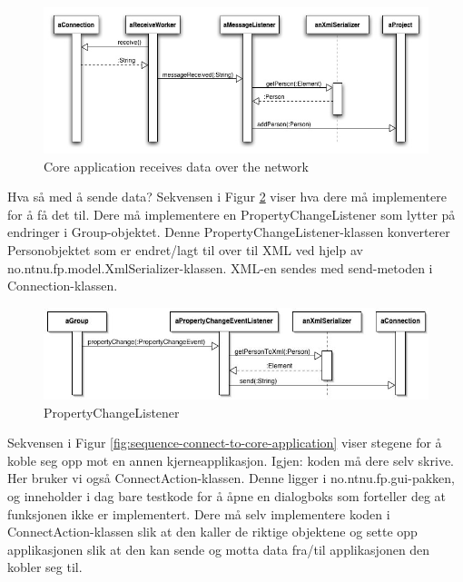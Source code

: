 \begin{figure}[H]
    \centering
    \includegraphics[width=\textwidth]{resources/sequence-core-application-receive-data.jpg}
    \caption{Core application receives data over the network}
    \label{fig:sequence-core-application-receive-data}
\end{figure}

Hva så med å sende data? Sekvensen i Figur \ref{fig:sequence-property-change-listener} viser hva dere må implementere for å få det til. Dere må implementere en PropertyChangeListener som lytter på endringer i Group-objektet. Denne PropertyChangeListener-klassen konverterer Personobjektet som er endret/lagt til over til XML ved hjelp av no.ntnu.fp.model.XmlSerializer-klassen. XML-en sendes med send-metoden i Connection-klassen.

\begin{figure}[H]
    \centering
    \includegraphics[width=\textwidth]{resources/sequence-property-change-listener.jpg}
    \caption{PropertyChangeListener}
    \label{fig:sequence-property-change-listener}
\end{figure}

Sekvensen i Figur \ref{fig:sequence-connect-to-core-application} viser stegene for å koble seg opp mot en annen kjerneapplikasjon. Igjen: koden må dere selv skrive. Her bruker vi også ConnectAction-klassen. Denne ligger i no.ntnu.fp.gui-pakken, og inneholder i dag bare testkode for å åpne en dialogboks som forteller deg at funksjonen ikke er implementert. Dere må selv implementere koden i ConnectAction-klassen slik at den kaller de riktige objektene og sette opp applikasjonen slik at den kan sende og motta data fra/til applikasjonen den kobler seg til.

